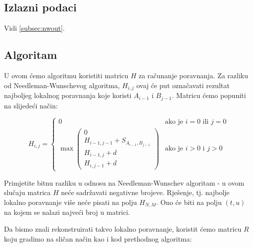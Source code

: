 \documentclass[times, utf8, zavrsni]{fer}
\begin{document}
\subsection{Izlazni podaci}
Vidi \autoref{subsec:nwout}.

\subsection{Algoritam}
\label{subsec:swalg}
U ovom ćemo algoritmu koristiti matricu $H$ za računanje poravnanja.
Za razliku od Nee{\-}dle{\-}man-Wunschevog algoritma, $H_{i,j}$ ovaj će put
označavati rezultat
najboljeg lokalnog poravnanja koje koristi $A_{i-1}$ i $B_{j-1}$.
Matricu ćemo popuniti na slijedeći način:

$$
H_{i,j} =
\left\{ \begin{array}{ll}
	0 & \mbox{ako je } i=0 \mbox{ ili } j=0 \\
	\max \left( \begin{array}{l}
		0 \\
		H_{i-1,j-1} + S_{A_{i-1}, B_{j-1}} \\
		H_{i-1, j} + d \\
		H_{i, j-1} + d
	\end{array} \right) & \mbox{ako je } i>0 \mbox{ i } j>0
\end{array} \right.
$$

Primjetite bitnu razliku u odnosu na Needleman-Wunschev algoritam - u ovom
slučaju matrica $H$ neće sadržavati negativne brojeve. Rješenje, tj. najbolje
lokalno poravnanje više neće pisati na polju $H_{N, M}$. Ono će biti na polju 
$(t, u)$ na kojem se nalazi najveći broj u matrici.

Da bismo znali rekonstruirati takvo lokalno poravnanje, koristit ćemo matricu
$R$ koju gradimo na sličan način kao i kod prethodnog algoritma:
\end{document}

